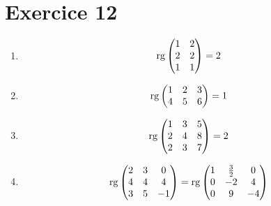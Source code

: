 \part{Exercice 12}

\begin{enumerate}
	\item \[
			\operatorname{rg} \begin{pmatrix}
				1&2\\2&2\\1&1
			\end{pmatrix} = 2
		\]
	\item
		\[
			\operatorname{rg} \begin{pmatrix}
				1&2&3\\
				4&5&6
			\end{pmatrix} = 1
		\] 
	\item
		\[
			\operatorname{rg}
			\begin{pmatrix}
				1&3&5\\
				2&4&8\\
				2&3&7
			\end{pmatrix}=2
		\]

	\item
		\[
			\operatorname{rg} \begin{pmatrix}
				2&3&0\\
				4&4&4\\
				3&5&-1
			\end{pmatrix} = \operatorname{rg} \begin{pmatrix}
				1&\frac{3}{2}&0\\
				0&-2&4\\
				0&9&-4
			\end{pmatrix} 
		\] 
\end{enumerate}
